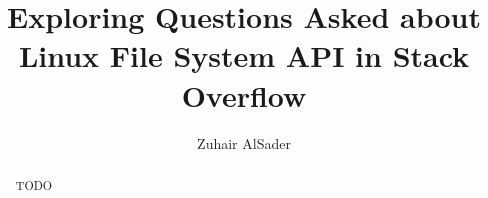 \documentclass[sigconf]{acmart}
\begin{document}
\title{Exploring Questions Asked about Linux File System API in Stack Overflow}

\author{Zuhair AlSader}

\begin{abstract}
TODO
\end{abstract}



\maketitle





\end{document}

